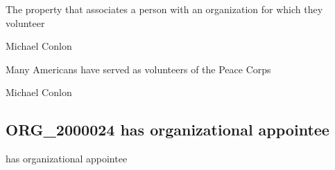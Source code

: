 \documentclass[letterpaper,10pt,english]{sphinxmanual}
\begin{document}
\begin{sphinxShadowBox}

\sphinxAtStartPar
The property that associates a person with an organization for which they volunteer
\end{sphinxShadowBox}

\begin{sphinxShadowBox}

\sphinxAtStartPar
Michael Conlon 
\end{sphinxShadowBox}

\begin{sphinxShadowBox}

\sphinxAtStartPar
{\hyperref[\detokenize{doc-NCBITaxon_9606::doc}]{}}
\end{sphinxShadowBox}

\begin{sphinxShadowBox}

\sphinxAtStartPar
{\hyperref[\detokenize{doc-ORG_0000001::doc}]{}}
\end{sphinxShadowBox}

\begin{sphinxShadowBox}

\sphinxAtStartPar
Many Americans have served as volunteers of the Peace Corps
\end{sphinxShadowBox}

\begin{sphinxShadowBox}

\sphinxAtStartPar
Michael Conlon 
\end{sphinxShadowBox}
\begin{quote}

\ignorespaces \end{quote}


\subsection{ORG\_2000024 \sphinxhyphen{} has organizational appointee}
\label{\detokenize{doc-ORG_2000024:org-2000024-has-organizational-appointee}}\label{\detokenize{doc-ORG_2000024:index-0}}\label{\detokenize{doc-ORG_2000024::doc}}
\begin{sphinxShadowBox}

\sphinxAtStartPar
has organizational appointee
\end{sphinxShadowBox}
\end{document}
